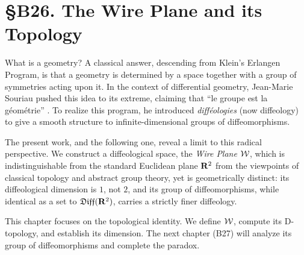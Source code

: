 
\chapter*{\S B26. The Wire Plane and its Topology}
\setcounter{footnote}{0}


\begin{abstract}
  We introduce the \emph{Wire Plane} $\cW$,
  a diffeological space whose underlying set is $\RR^2$
  but whose smooth structure is defined by plots that factor locally through smooth curves.
  We prove that the D-topology of $\cW$ coincides with the standard Euclidean topology,
  yet the diffeological dimension of $\cW$ is $1$,
  not $2$.
  This is the first step in exhibiting the \emph{Boman Paradox}:
  two diffeological spaces with identical topology and identical abstract diffeomorphism groups
  that are nevertheless geometrically distinct.
\end{abstract}


What is a geometry?
A classical answer,
descending from Klein's Erlangen Program,
is that a geometry is determined by a space together with a group of symmetries acting upon it.
In the context of differential geometry,
Jean-Marie Souriau pushed this idea to its extreme,
claiming that ``le groupe est la géométrie'' \cite{Sou84}.
To realize this program,
he introduced \emph{difféologies} (now diffeology) to give a smooth structure to infinite-dimensional groups of diffeomorphisms.

The present work,
and the following one,
reveal a limit to this radical perspective.
We construct a diffeological space,
the \emph{Wire Plane} $\cW$,
which is indistinguishable from the standard Euclidean plane $\RR^2$ from the viewpoints of classical topology and abstract group theory,
yet is geometrically distinct:
its diffeological dimension is $1$, not $2$,
and its group of diffeomorphisms,
while identical as a set to $\mathfrak{Diff}(\mathbf{R}^2)$,
carries a strictly finer diffeology.

This chapter focuses on the topological identity.
We define $\cW$,
compute its D-topology,
and establish its dimension.
The next chapter (B27) will analyze its group of diffeomorphisms and complete the paradox.

